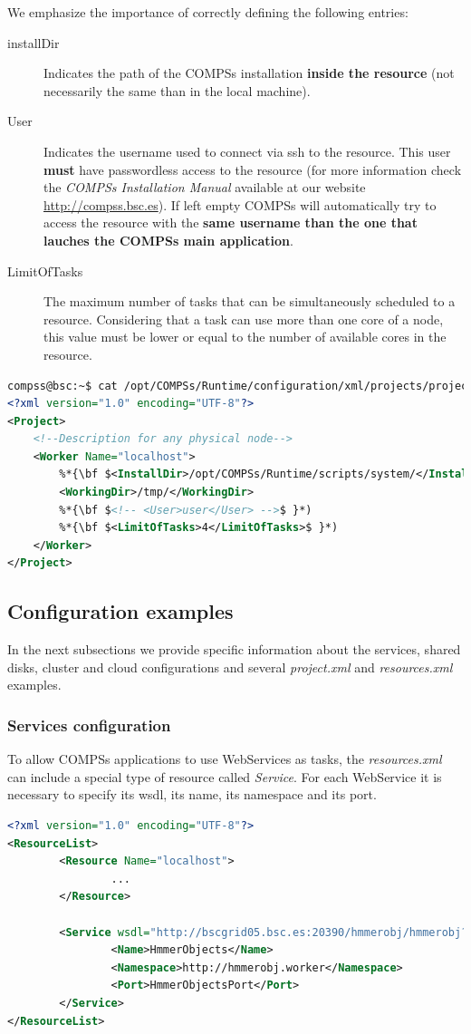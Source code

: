 We emphasize the importance of correctly defining the following entries:
\begin{description}
 \item [installDir] Indicates the path of the COMPSs installation \textbf{inside the resource} (not necessarily the same 
 than in the local machine).
 \item [User] Indicates the username used to connect via ssh to the resource. This user \textbf{must} have passwordless access to the
 resource (for more information check the \textit{COMPSs Installation Manual} available at our website \url{http://compss.bsc.es}).
 If left empty COMPSs will automatically try to access the resource with the \textbf{same username than the one that lauches 
 the COMPSs main application}.
 \item [LimitOfTasks] The maximum number of tasks that can be simultaneously scheduled to a resource. Considering that a task 
 can use more than one core of a node, this value must be lower or equal to the number of available cores in the resource. 
\end{description}


\begin{lstlisting}[language=xml]
compss@bsc:~$ cat /opt/COMPSs/Runtime/configuration/xml/projects/project.xml
<?xml version="1.0" encoding="UTF-8"?>
<Project>
	<!--Description for any physical node-->
	<Worker Name="localhost">
		%*{\bf $<InstallDir>/opt/COMPSs/Runtime/scripts/system/</InstallDir>$ }*)
		<WorkingDir>/tmp/</WorkingDir>
		%*{\bf $<!-- <User>user</User> -->$ }*)
		%*{\bf $<LimitOfTasks>4</LimitOfTasks>$ }*)
	</Worker>
</Project>
\end{lstlisting}
\label{lstlisting:project.xml}


\subsection{Configuration examples}
In the next subsections we provide specific information about the services, shared disks, cluster and cloud configurations and several \textit{project.xml} and \textit{resources.xml} examples. 


\subsubsection{Services configuration}
To allow COMPSs applications to use WebServices as tasks, the \textit{resources.xml} can include a special type of resource called 
\textit{Service}. For each WebService it is necessary to specify its wsdl, its name, its namespace and
its port. 
\begin{lstlisting}[language=xml]
<?xml version="1.0" encoding="UTF-8"?>
<ResourceList>
        <Resource Name="localhost">
                ...
        </Resource>
                
        <Service wsdl="http://bscgrid05.bsc.es:20390/hmmerobj/hmmerobj?wsdl">
                <Name>HmmerObjects</Name>
                <Namespace>http://hmmerobj.worker</Namespace>
                <Port>HmmerObjectsPort</Port>
        </Service>
</ResourceList>
\end{lstlisting}


